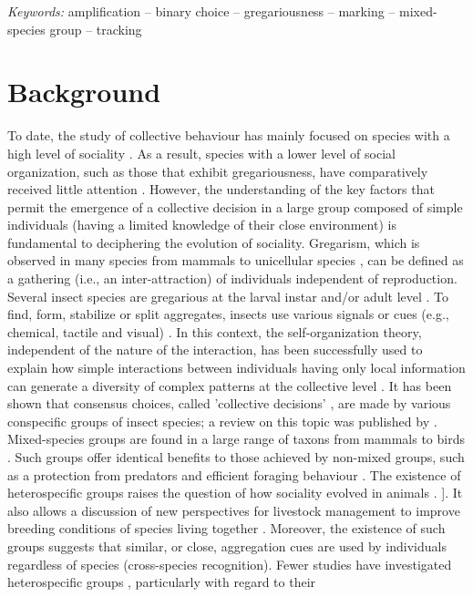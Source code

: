 \textit{Keywords:} amplification – binary choice – gregariousness – marking – mixed-species group – tracking 

\clearpage

	\section{Background}
To date, the study of collective behaviour has mainly focused on species with a high level of sociality \cite{costa_other_2006}. As a result, species with a lower level of social organization, such as those that exhibit gregariousness, have comparatively received little attention \cite{costa_other_2006}. However, the understanding of the key factors that permit the emergence of a collective decision in a large group composed of simple individuals (having a limited knowledge of their close environment) is fundamental to deciphering the evolution of sociality. Gregarism, which is observed in many species from mammals to unicellular species \citep{costa_other_2006,krause_living_2002,sumpter_collective_2009,parrish_complexity_1999}, can be defined as a gathering (i.e., an inter-attraction) of individuals independent of reproduction. Several insect species are gregarious at the larval instar and/or adult level \citep{costa_other_2006,jeanson_key_2012}. To find, form, stabilize or split aggregates, insects use various signals or cues (e.g., chemical, tactile and visual) \citep{costa_other_2006,krause_living_2002,sumpter_collective_2009,camazine_self-organization_2001}. In this context, the self-organization theory, independent of the nature of the interaction, has been successfully used to explain how simple interactions between individuals having only local information can generate a diversity of complex patterns at the collective level \citep{camazine_self-organization_2001,deneubourg_dynamics_2002,deneubourg_collective_1989}. It has been shown that consensus choices, called 'collective decisions' \citep{jeanson_key_2012,conradt_consensus_2005}, are made by various conspecific groups of insect species; a review on this topic was published by \citet{jeanson_key_2012}. Mixed-species groups are found in a large range of taxons from mammals \cite{stensland_mixed_2003} to birds \cite{farine_collective_2014}. Such groups offer identical benefits to those achieved by non-mixed groups, such as a protection from predators and efficient foraging behaviour \cite{costa_other_2006}. The existence of heterospecific groups raises the question of how sociality evolved in animals \citep{costa_other_2006,wilson_insect_1971}. ]. It also allows a discussion of new perspectives for livestock management to improve breeding conditions of species living together \cite{anderson_managing_2012}. Moreover, the existence of such groups suggests that similar, or close, aggregation cues are used by individuals regardless of species (cross-species recognition). Fewer studies have investigated heterospecific groups \cite{stensland_mixed_2003,farine_mixed-species_2014,diamond_mixed-species_1981}, particularly with regard to their 